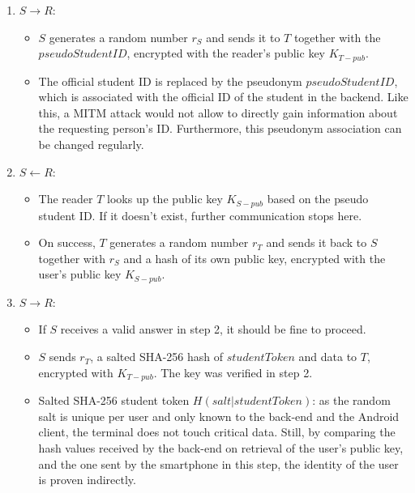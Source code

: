 \begin{enumerate}
	\item $ S \rightarrow R $:
	\begin{itemize}
		\item $ S $ generates a random number $ r_S $ and sends it to $ T $ together with the $ pseudoStudentID $, encrypted with the reader's public key $ K_{T-pub} $.
		\item The official student ID is replaced by the pseudonym $ pseudoStudentID $, which is associated with the official ID of the student in the backend.
		Like this, a MITM attack would not allow to directly gain information about the requesting person's ID.
		Furthermore, this pseudonym association can be changed regularly.
	\end{itemize}	
	\item $ S \leftarrow R $:
	\begin{itemize}
		\item The reader $ T $ looks up the public key $ K_{S-pub} $ based on the pseudo student ID. If it doesn't exist, further communication stops here.
		\item On success, $ T $ generates a random number $ r_T $ and sends it back to $ S $ together with $ r_S $ and a hash of its own public key, encrypted with the user's public key $ K_{S-pub} $.
	\end{itemize}	
	\item $ S \rightarrow R $:
	\begin{itemize}
		\item If $ S $ receives a valid answer in step 2, it should be fine to proceed.
		\item $ S $ sends $ r_T $, a salted SHA-256 hash of $ studentToken $ and data to $ T $, encrypted with $ K_{T-pub} $. The key was verified in step 2.
		\item Salted SHA-256 student token $ H(salt|studentToken) $: as the random salt is unique per user and only known to the back-end and the Android client, the terminal does not touch critical data.
		Still, by comparing the hash values received by the back-end on retrieval of the user's public key, and the one sent by the smartphone in this step, the identity of the user is proven indirectly.
	\end{itemize}
\end{enumerate}

